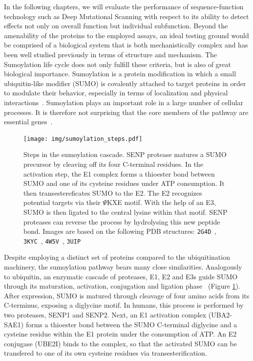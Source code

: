 In the following chapters, we will evaluate the performance of sequence-function technology such as Deep Mutational Scanning with respect to its ability to detect effects not only on overall function but individual subfunction. Beyond the amenability of the proteins to the employed assays, an ideal testing ground would be comprised of a biological system that is both mechanistically complex and has been well studied previously in terms of structure and mechanism. The Sumoylation life cycle does not only fulfill these criteria, but is also of great biological importance. Sumoylation is a protein modification in which a small ubiquitin-like modifier (SUMO) is covalently attached to target proteins in order to modulate their behavior, especially in terms of localization and physical interactions~\cite{sumoylation}. Sumoylation plays an important role in a large number of cellular processes. It is therefore not surprising that the core members of the pathway are essential genes~.

\begin{figure}
	\centering
	\texttt{[image: img/sumoylation\_steps.pdf]}
	\caption{Steps in the sumoylation cascade. SENP protease matures a SUMO precursor by cleaving off its four C-terminal residues. In the activation step, the E1 complex forms a thioester bond  between SUMO and one of its cysteine residues under ATP consumption. It then transestereficates SUMO to the E2. The E2 recognizes potential targets via their $\Psi$KXE motif. With the help of an E3, SUMO is then ligated to the central lysine within that motif. SENP proteases can reverse the process by hydrolysing this new peptide bond. Images are based on the following PDB structures: \texttt{2G4D}~\cite{Xu2006}, \texttt{3KYC}~\cite{Olsen2010}, \texttt{4W5V}~\cite{ReiterEtAl}, \texttt{3UIP}~\cite{Gareau2012}}
	\label{fig:sumoylation_steps}
\end{figure}

Despite employing a distinct set of proteins compared to the ubiquitination machinery, the sumoylation pathway bears many close similarities. Analogously to ubiquitin, an enzymatic cascade of proteases, E1, E2 and E3s guide SUMO through its maturation, activation, conjugation and ligation phase~\cite{sumoylation} (Figure \ref{fig:sumoylation_steps}). After expression, SUMO is matured through cleavage of four amino acids from its C-terminus, exposing a diglycine motif. In humans, this process is performed by two proteases, SENP1 and SENP2. Next, an E1 activation complex (UBA2-SAE1) forms a thioester bond between the SUMO C-terminal diglycine and a cysteine residue within the E1 protein under the consumption of ATP. An E2 conjugase (UBE2I) binds to the complex, so that the activated SUMO can be transfered to one of its own cysteine residues via transesterification. 

